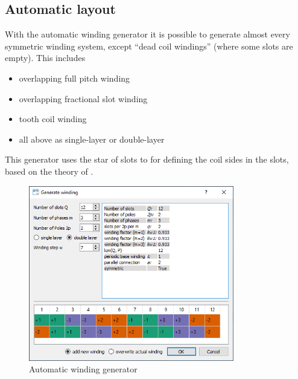 \documentclass[]{scrreprt}
\begin{document}
\subsection{Automatic layout}\label{sec:automatic_generator}
With the automatic winding generator it is possible to generate almost every symmetric winding system, 
except "`dead coil windings"' (where some slots are empty). 
This includes
\begin{itemize}
 \item overlapping full pitch winding
 \item overlapping fractional slot winding
 \item tooth coil winding
 \item all above as single-layer or double-layer
\end{itemize}
%
This generator uses the star of slots to for defining
the coil sides in the slots, based on the theory of \cite{1629527}.
%
\begin{figure}[htpb]
    \centering
    \includegraphics[width=0.80\textwidth,angle=0]{fig/auto_winding}
    \caption{Automatic winding generator }
    \label{fig:auto_winding}
\end{figure}
%
%
\end{document}
